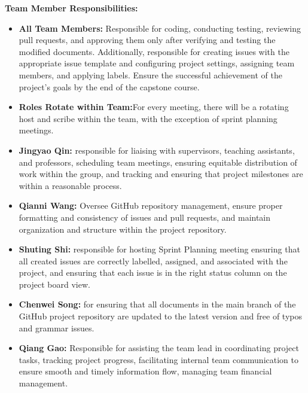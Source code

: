\documentclass{article}
\begin{document}
\textbf{Team Member Responsibilities:}
\begin{itemize}
	\item \textbf{All Team Members:} Responsible for coding, conducting testing, reviewing pull requests, and approving them only after verifying and testing the modified documents. Additionally, responsible for creating issues with the appropriate issue template and configuring project settings, assigning team members, and applying labels. Ensure the successful achievement of the project's goals by the end of the capstone course.
	\item \textbf{Roles Rotate within Team:}For every meeting, there will be a rotating host and scribe within the team, with the exception of sprint planning meetings.
    \item \textbf{Jingyao Qin:} responsible for liaising with supervisors, teaching assistants, and professors, scheduling team meetings, ensuring equitable distribution of work within the group, and tracking and ensuring that project milestones are within a reasonable process.
    \item \textbf{Qianni Wang:} Oversee GitHub repository management, ensure proper formatting and consistency of issues and pull requests, and maintain organization and structure within the project repository.
    \item \textbf{Shuting Shi:} responsible for hosting  Sprint Planning meeting ensuring that all created issues are correctly labelled, assigned, and associated with the project, and ensuring that each issue is in the right status column on the project board view.
    \item \textbf{Chenwei Song:} for ensuring that all documents in the main branch of the GitHub project repository are updated to the latest version and free of typos and grammar issues.
    \item \textbf{Qiang Gao:} Responsible for assisting the team lead in coordinating project tasks, tracking project progress, facilitating internal team communication to ensure smooth and timely information flow, managing team financial management.
    
\end{itemize}
\end{document}
